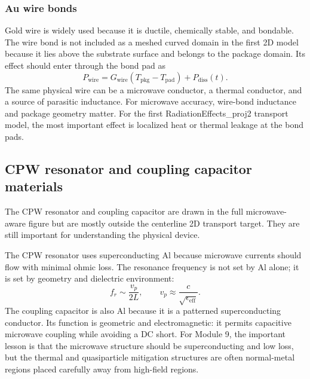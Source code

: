 \documentclass[11pt]{article}
\begin{document}
\subsubsection{Au wire bonds}
Gold wire is widely used because it is ductile, chemically stable, and bondable. The wire bond is not included as a meshed curved domain in the first 2D model because it lies above the substrate surface and belongs to the package domain. Its effect should enter through the bond pad as
\begin{equation}
    P_{\mathrm{wire}} = G_{\mathrm{wire}}(T_{\mathrm{pkg}}-T_{\mathrm{pad}})+P_{\mathrm{diss}}(t).
\end{equation}
The same physical wire can be a microwave conductor, a thermal conductor, and a source of parasitic inductance. For microwave accuracy, wire-bond inductance and package geometry matter. For the first RadiationEffects\_proj2 transport model, the most important effect is localized heat or thermal leakage at the bond pads.

\subsection{CPW resonator and coupling capacitor materials}
The CPW resonator and coupling capacitor are drawn in the full microwave-aware figure but are mostly outside the centerline 2D transport target. They are still important for understanding the physical device.

The CPW resonator uses superconducting Al because microwave currents should flow with minimal ohmic loss. The resonance frequency is not set by Al alone; it is set by geometry and dielectric environment:
\begin{equation}
    f_r \sim \frac{v_p}{2L},
    \qquad
    v_p\approx \frac{c}{\sqrt{\epsilon_{\mathrm{eff}}}}.
\end{equation}
The coupling capacitor is also Al because it is a patterned superconducting conductor. Its function is geometric and electromagnetic: it permits capacitive microwave coupling while avoiding a DC short. For Module 9, the important lesson is that the microwave structure should be superconducting and low loss, but the thermal and quasiparticle mitigation structures are often normal-metal regions placed carefully away from high-field regions.
\end{document}
